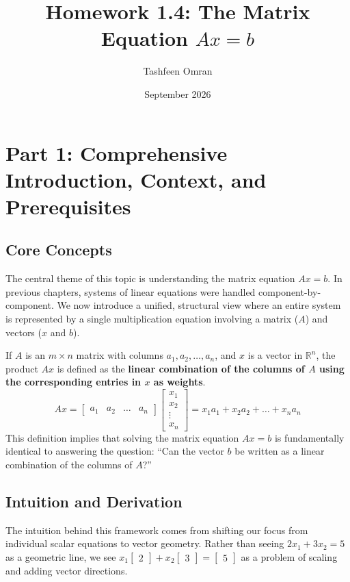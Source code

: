 \documentclass{article}
\title{Homework 1.4: The Matrix Equation $Ax = b$}
\author{Tashfeen Omran}
\date{September 2026}
\begin{document}
\maketitle

\tableofcontents
\newpage

\section{Part 1: Comprehensive Introduction, Context, and Prerequisites}

\subsection{Core Concepts}
The central theme of this topic is understanding the matrix equation $Ax = b$. In previous chapters, systems of linear equations were handled component-by-component. We now introduce a unified, structural view where an entire system is represented by a single multiplication equation involving a matrix ($A$) and vectors ($x$ and $b$).

If $A$ is an $m \times n$ matrix with columns $a_1, a_2, \dots, a_n$, and $x$ is a vector in $\mathbb{R}^n$, the product $Ax$ is defined as the \textbf{linear combination of the columns of $A$ using the corresponding entries in $x$ as weights}. 
\[ Ax = \begin{bmatrix} a_1 & a_2 & \dots & a_n \end{bmatrix} \begin{bmatrix} x_1 \\ x_2 \\ \vdots \\ x_n \end{bmatrix} = x_1a_1 + x_2a_2 + \dots + x_na_n \]
This definition implies that solving the matrix equation $Ax = b$ is fundamentally identical to answering the question: ``Can the vector $b$ be written as a linear combination of the columns of $A$?''

\subsection{Intuition and Derivation}
The intuition behind this framework comes from shifting our focus from individual scalar equations to vector geometry. Rather than seeing $2x_1 + 3x_2 = 5$ as a geometric line, we see $x_1 \begin{bmatrix} 2 \end{bmatrix} + x_2 \begin{bmatrix} 3 \end{bmatrix} = \begin{bmatrix} 5 \end{bmatrix}$ as a problem of scaling and adding vector directions. 
\end{document}
